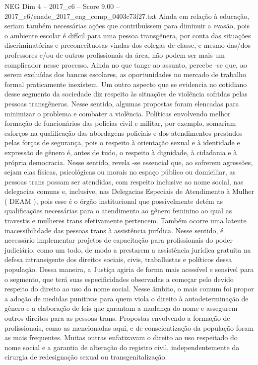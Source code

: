 \begin{textsample}{NEG Dim 4 – 2017\_c6 – Score 9.00 – 2017\_c6/enade\_2017\_eng\_comp\_0403c73f27.txt}
Ainda em relação à educação, seriam também necessárias ações que contribuíssem para diminuir a evasão, pois o ambiente escolar é difícil para uma pessoa transgênera, por conta das situações discriminatórias e preconceituosas vindas dos colegas de classe, e mesmo das/dos professores e/ou de outros profissionais da área, não podem ser mais um complicador nesse processo.
Ainda no que tange ao assunto, percebe -se que, ao serem excluídas dos bancos escolares, as oportunidades no mercado de trabalho formal praticamente inexistem.
Um outro aspecto que se evidencia no cotidiano desse segmento da sociedade diz respeito às situações de violência sofridas pelas pessoas transgêneras.
Nesse sentido, algumas propostas foram elencadas para minimizar o problema e combater a violência.
Políticas envolvendo melhor formação de funcionários das polícias civil e militar, por exemplo, somariam esforços na qualificação das abordagens policiais e dos atendimentos prestados pelas forças de segurança, pois o respeito à orientação sexual e à identidade e expressão de gênero é, antes de tudo, o respeito à dignidade, à cidadania e à própria democracia.
Nesse sentido, revela -se essencial que, ao sofrerem agressões, sejam elas físicas, psicológicas ou morais no espaço público ou domiciliar, as pessoas trans possam ser atendidas, com respeito inclusive ao nome social, nas delegacias comuns e, inclusive, nas Delegacias Especiais de Atendimento à Mulher ( DEAM ), pois esse é o órgão institucional que possivelmente detém as qualificações necessárias para o atendimento ao gênero feminino ao qual as travestis e mulheres trans efetivamente pertencem.
Também ocorre uma latente inacessibilidade das pessoas trans à assistência jurídica.
Nesse sentido, é necessário implementar projetos de capacitação para profissionais do poder judiciário, como um todo, de modo a prestarem a assistência jurídica gratuita na defesa intransigente dos direitos sociais, civis, trabalhistas e políticos dessa população.
Dessa maneira, a Justiça agiria de forma mais acessível e sensível para o segmento, que terá suas especificidades observadas a começar pelo devido respeito do direito ao uso do nome social.
Nesse âmbito, o mais comum foi propor a adoção de medidas punitivas para quem viola o direito à autodeterminação de gênero e a elaboração de leis que garantam a mudança do nome e assegurem outros direitos para as pessoas trans.
Propostas envolvendo a formação de profissionais, como as mencionadas aqui, e de conscientização da população foram as mais frequentes.
Muitas outras enfatizavam o direito ao uso respeitado do nome social e a garantia de alteração do registro civil, independentemente da cirurgia de redesignação sexual ou transgenitalização.

\end{textsample}

